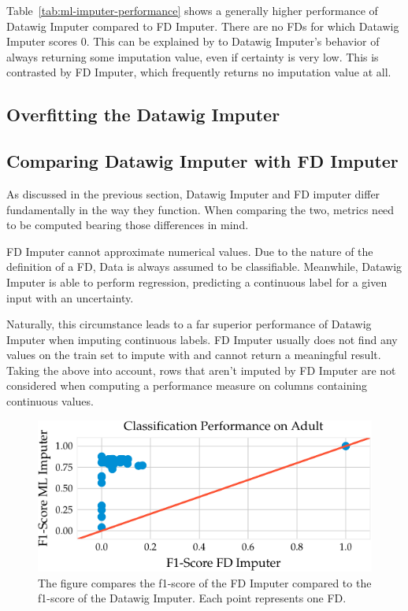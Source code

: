 Table~\ref{tab:ml-imputer-performance} shows a generally higher performance of Datawig Imputer compared to FD Imputer.
There are no FDs for which Datawig Imputer scores 0.
This can be explained by to Datawig Imputer's behavior of always returning some imputation value, even if certainty is very low.
This is contrasted by FD Imputer, which frequently returns no imputation value at all.

\subsection{Overfitting the Datawig Imputer}

\subsection{Comparing Datawig Imputer with FD Imputer}
As discussed in the previous section, Datawig Imputer and FD imputer differ fundamentally in the way they function.
When comparing the two, metrics need to be computed bearing those differences in mind.

FD Imputer cannot approximate numerical values.
Due to the nature of the definition of a FD, Data is always assumed to be classifiable.
Meanwhile, Datawig Imputer is able to perform regression, predicting a continuous label for a given input with an uncertainty.

Naturally, this circumstance leads to a far superior performance of Datawig Imputer when imputing continuous labels.
FD Imputer usually does not find any values on the train set to impute with and cannot return a meaningful result.
Taking the above into account, rows that aren't imputed by FD Imputer are not considered when computing a performance measure on columns containing continuous values.

\begin{figure}[ht]
     \centering
     \includegraphics[width=.8\textwidth]{../figures/adult/f1_ml_fd_adult}
     \caption{The figure compares the f1-score of the FD Imputer compared to the f1-score of the Datawig Imputer. Each point represents one FD.}
     \label{fig:f1_ml_fd_adult}
 \end{figure}

